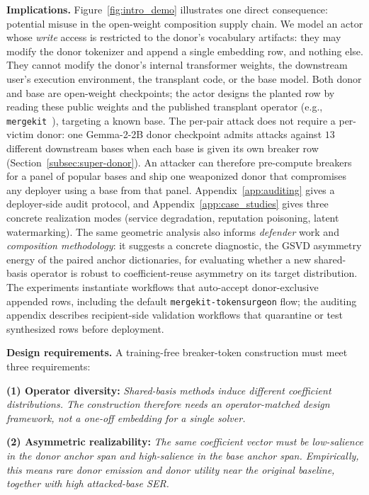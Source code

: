 
\noindent\textbf{Implications.} Figure~\ref{fig:intro_demo} illustrates one direct consequence: potential misuse in the open-weight composition supply chain. We model an actor whose \emph{write} access is restricted to the donor's vocabulary artifacts: they may modify the donor tokenizer and append a single embedding row, and nothing else. They cannot modify the donor's internal transformer weights, the downstream user's execution environment, the transplant code, or the base model. Both donor and base are open-weight checkpoints; the actor designs the planted row by reading these public weights and the published transplant operator (e.g., \texttt{mergekit}~\citep{mergekit2024}), targeting a known base. The per-pair attack does not require a per-victim donor: one Gemma-2-2B donor checkpoint admits attacks against $13$ different downstream bases when each base is given its own breaker row (Section~\ref{subsec:super-donor}). An attacker can therefore pre-compute breakers for a panel of popular bases and ship one weaponized donor that compromises any deployer using a base from that panel. Appendix~\ref{app:auditing} gives a deployer-side audit protocol, and Appendix~\ref{app:case_studies} gives three concrete realization modes (service degradation, reputation poisoning, latent watermarking). The same geometric analysis also informs \emph{defender} work and \emph{composition methodology}: it suggests a concrete diagnostic, the GSVD asymmetry energy of the paired anchor dictionaries, for evaluating whether a new shared-basis operator is robust to coefficient-reuse asymmetry on its target distribution. The experiments instantiate workflows that auto-accept donor-exclusive appended rows, including the default \texttt{mergekit-tokensurgeon} flow; the auditing appendix describes recipient-side validation workflows that quarantine or test synthesized rows before deployment.


\noindent\textbf{Design requirements.}
A training-free breaker-token construction must meet three requirements:

\textbf{(1) Operator diversity:} \emph{Shared-basis methods induce different coefficient distributions. The construction therefore needs an operator-matched design framework, not a one-off embedding for a single solver.}

\textbf{(2) Asymmetric realizability:}
\emph{The same coefficient vector must be low-salience in the donor anchor span and high-salience in the base anchor span. Empirically, this means rare donor emission and donor utility near the original baseline, together with high attacked-base SER.}

